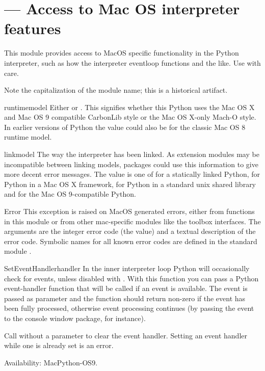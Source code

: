 \section{ ---
         Access to Mac OS interpreter features}



This module provides access to MacOS specific functionality in the
Python interpreter, such as how the interpreter eventloop functions
and the like. Use with care.

Note the capitalization of the module name; this is a historical
artifact.

\begin{datadesc}{runtimemodel}
Either or .  This
signifies whether this Python uses the Mac OS X and Mac OS 9 compatible 
CarbonLib style or the Mac OS
X-only Mach-O style. In earlier versions of Python  the value could
also be  for the classic Mac OS 8 runtime model.
\end{datadesc}

\begin{datadesc}{linkmodel}
The way the interpreter has been linked. As extension modules may be
incompatible between linking models, packages could use this information to give
more decent error messages. The value is one of  for a
statically linked Python,  for Python in a Mac OS X framework,
 for Python in a standard unix shared library and
 for the Mac OS 9-compatible Python.
\end{datadesc}

\begin{excdesc}{Error}
This exception is raised on MacOS generated errors, either from
functions in this module or from other mac-specific modules like the
toolbox interfaces. The arguments are the integer error code (the
 value) and a textual description of the error code.
Symbolic names for all known error codes are defined in the standard
module .
\end{excdesc}

\begin{funcdesc}{SetEventHandler}{handler}
In the inner interpreter loop Python will occasionally check for events,
unless disabled with . With this function you
can pass a Python event-handler function that will be called if an event
is available. The event is passed as parameter and the function should return
non-zero if the event has been fully processed, otherwise event processing
continues (by passing the event to the console window package, for instance).

Call  without a parameter to clear the
event handler. Setting an event handler while one is already set is an
error.

Availability: MacPython-OS9.
\end{funcdesc}

